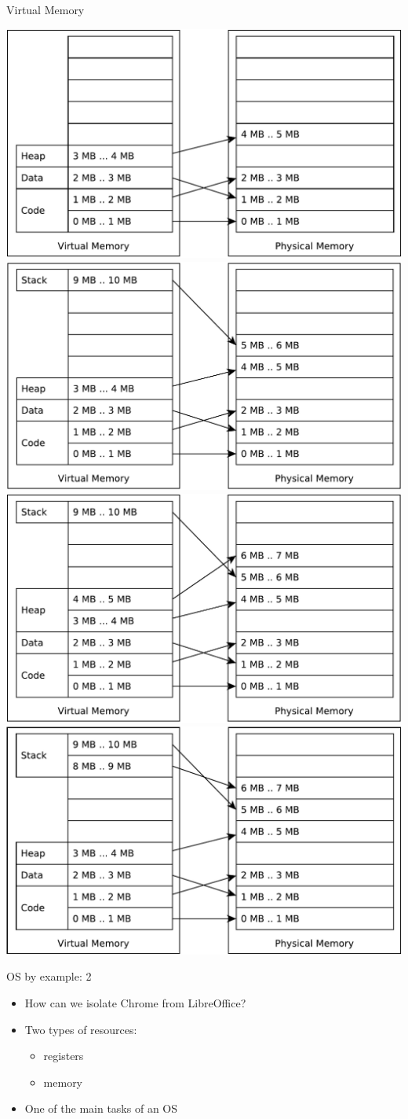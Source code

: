 \documentclass{beamer}
\begin{document}
\begin{frame}{Virtual Memory}
\begin{center}
{}
     {
  \includegraphics[width=0.5\linewidth]{mmu7}
}
     {
  \includegraphics[width=0.5\linewidth]{mmu8}
}
     {
  \includegraphics[width=0.5\linewidth]{mmu9}
}
     {
  \includegraphics[width=0.5\linewidth]{mmu10}
}
  \end{center}
\end{frame}





\begin{frame}{OS by example: 2}
  \begin{itemize}
    \item How can we isolate Chrome from LibreOffice?
    \item<2-> Two types of resources:
      \begin{itemize}
        \item registers 
        \item memory 
      \end{itemize}
    \item <3-> One of the main tasks of an OS
  \end{itemize}
\end{frame}
\end{document}
